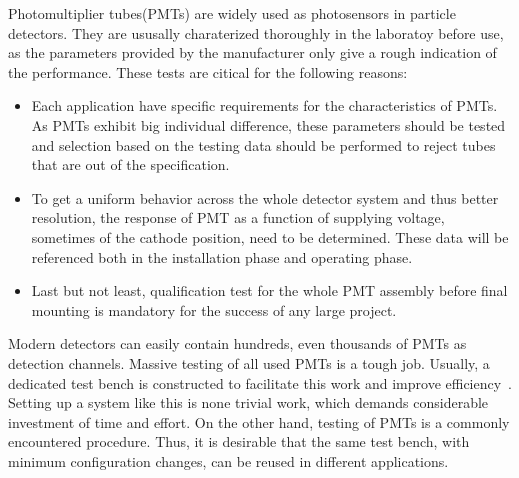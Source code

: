 \documentclass[5p, times]{elsarticle}
\begin{document}

Photomultiplier tubes(PMTs) are widely used as photosensors in particle detectors.
They are ususally charaterized thoroughly in the laboratoy before use, as the parameters provided by the manufacturer only give a rough indication of the performance.
These tests are citical for the following reasons:
\begin{itemize}
 \item Each application have specific requirements for the characteristics of PMTs.
 As PMTs exhibit big individual difference, these parameters should be tested and selection based on the testing data should be performed to reject tubes that are out of the specification.
 \item To get a uniform behavior across the whole detector system and thus better resolution, the response of PMT as a function of supplying voltage, sometimes of the cathode position, need to be determined.
  These data will be referenced both in the installation phase and operating phase. 
 \item Last but not least, qualification test for the whole PMT assembly before final mounting is mandatory for the success of any large project. 
\end{itemize}

Modern detectors can easily contain hundreds, even thousands of PMTs as detection channels.
Massive testing of all used PMTs is a tough job.
Usually, a dedicated test bench is constructed to facilitate this work and improve efficiency~\cite{barnhill_testing_2008,akgun_complete_2005,adragna_pmt-block_2006}.
Setting up a system like this is none trivial work, which demands considerable investment of time and effort.
On the other hand, testing of PMTs is a commonly encountered procedure.
Thus, it is desirable that the same test bench, with minimum configuration changes, can be reused in different applications. 
\end{document}
